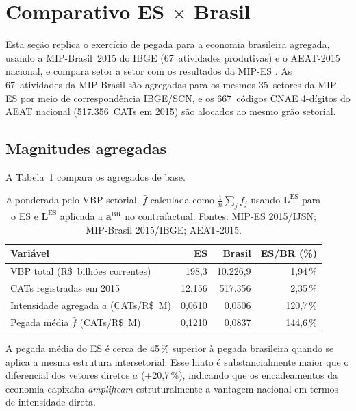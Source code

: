 \documentclass[12pt, a4paper]{article}
\begin{document}
\section{Comparativo ES $\times$ Brasil}
\label{sec:comparativo}

Esta seção replica o exercício de pegada para a economia brasileira
agregada, usando a MIP-Brasil~2015 do IBGE (67~atividades produtivas)
e o AEAT-2015 nacional, e compara setor a setor com os resultados da
MIP-ES \citep{ibge2017mipbr,aeat2016}. As 67~atividades da MIP-Brasil
são agregadas para os mesmos 35~setores da MIP-ES por meio de
correspondência IBGE/SCN, e os 667~códigos CNAE 4-dígitos do AEAT
nacional (517.356~CATs em 2015) são alocados ao mesmo grão setorial.

\subsection{Magnitudes agregadas}

A Tabela~\ref{tab:bres_macro} compara os agregados de base.

\begin{table}[H]
\centering
\small
\caption{Comparativo macroeconômico ES $\times$ Brasil, 2015}
\label{tab:bres_macro}
\begin{tabular}{lrrr}
\toprule
\textbf{Variável} & \textbf{ES} & \textbf{Brasil} & \textbf{ES/BR (\%)} \\
\midrule
VBP total (R\$~bilhões correntes) & 198,3 & 10.226,9 & 1,94\,\% \\
CATs registradas em 2015 & 12.156 & 517.356 & 2,35\,\% \\
Intensidade agregada $\bar{a}$ (CATs/R\$~M) & 0,0610 & 0,0506 & 120,7\,\% \\
Pegada média $\bar{f}$ (CATs/R\$~M) & 0,1210 & 0,0837 & 144,6\,\% \\
\bottomrule
\end{tabular}
\caption*{\footnotesize $\bar{a}$ ponderada pelo VBP setorial.
$\bar{f}$ calculada como $\frac{1}{n}\sum_j f_j$ usando $\mathbf{L}^{\text{ES}}$
para o ES e $\mathbf{L}^{\text{ES}}$ aplicada a $\mathbf{a}^{\text{BR}}$
no contrafactual.
Fontes: MIP-ES 2015/IJSN; MIP-Brasil 2015/IBGE; AEAT-2015.}
\end{table}

A pegada média do ES é cerca de 45\,\% superior à pegada brasileira
quando se aplica a mesma estrutura intersetorial. Esse hiato é
substancialmente maior que o diferencial dos vetores diretos
$\bar{a}$ (+20{,}7\,\%), indicando que os encadeamentos da economia
capixaba \textit{amplificam} estruturalmente a vantagem nacional em
termos de intensidade direta.
\end{document}
